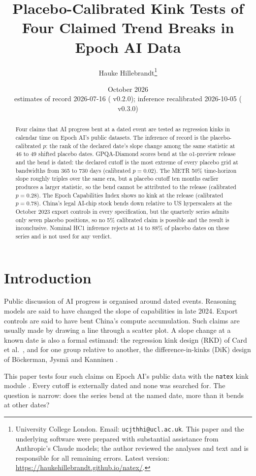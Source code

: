 \documentclass[11pt]{article}
\title{Placebo-Calibrated Kink Tests of Four Claimed Trend Breaks in Epoch AI Data}
\author{Hauke Hillebrandt\thanks{University College London. Email:
\texttt{ucjthhi@ucl.ac.uk}. This paper and the underlying \natex{} software were
prepared with substantial assistance from Anthropic's Claude models; the author
reviewed the analyses and text and is responsible for all remaining errors.
Latest version: \url{https://haukehillebrandt.github.io/natex/}.}}
\date{October 2026 \\ \small estimates of record 2026-07-16 (\natex{} v0.2.0);
inference recalibrated 2026-10-05 (\natex{} v0.3.0)}
\newcommand{\natex}{\texttt{natex}}
\begin{document}
\maketitle

\begin{abstract}
\noindent Four claims that AI progress bent at a dated event are tested as regression
kinks in calendar time on Epoch AI's public datasets. The inference of record is the
placebo-calibrated $p$: the rank of the declared date's slope change among the same
statistic at 46 to 49 shifted placebo dates. GPQA-Diamond scores bend at the o1-preview
release and the bend is dated: the declared cutoff is the most extreme of every placebo
grid at bandwidths from 365 to 730 days (calibrated $p = 0.02$). The METR 50\%
time-horizon slope roughly triples over the same era, but a placebo cutoff ten months
earlier produces a larger statistic, so the bend cannot be attributed to the release
(calibrated $p = 0.28$). The Epoch Capabilities Index shows no kink at the release
(calibrated $p = 0.78$). China's legal AI-chip stock bends down relative to US
hyperscalers at the October 2023 export controls in every specification, but the
quarterly series admits only seven placebo positions, so no 5\% calibrated claim is
possible and the result is inconclusive. Nominal HC1 inference rejects at 14 to 88\% of
placebo dates on these series and is not used for any verdict.
\end{abstract}

\section{Introduction}\label{sec:intro}

Public discussion of AI progress is organised around dated events. Reasoning models are
said to have changed the slope of capabilities in late 2024. Export controls are said to
have bent China's compute accumulation. Such claims are usually made by drawing a line
through a scatter plot. A slope change at a known date is also a formal estimand: the
regression kink design (RKD) of Card et al.\ \cite{card2015}, and for one group relative
to another, the difference-in-kinks (DiK) design of B\"ockerman, Jysm\"a and Kanninen
\cite{bockerman2025}.

This paper tests four such claims on Epoch AI's public data \cite{epochdata} with the
\natex{} kink module \cite{natex}. Every cutoff is externally dated and none was
searched for. The question is narrow: does the series bend at the named date, more than
it bends at other dates?
\end{document}
